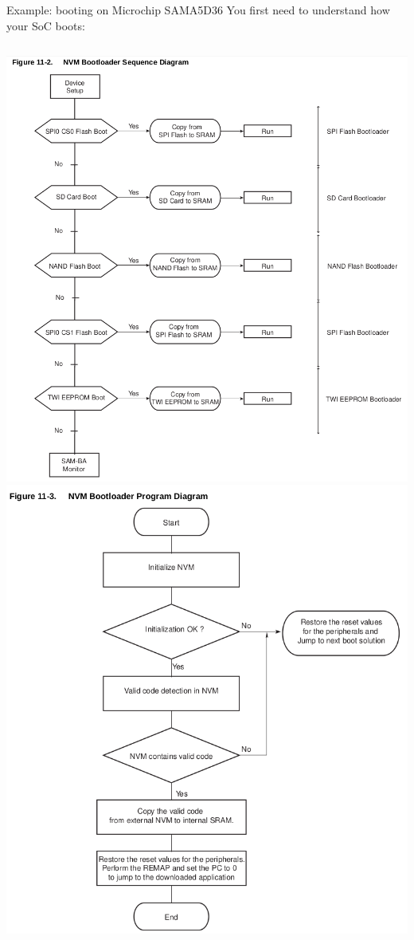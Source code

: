 \begin{frame}{Example: booting on Microchip SAMA5D36}
  \small You first need to understand how your SoC boots:
  \begin{columns}
    \includegraphics[height=0.7\textheight]{slides/boot-time-u-boot-falcon-mode/sama5d36-boot-diagram.png}
    \includegraphics[height=0.7\textheight]{slides/boot-time-u-boot-falcon-mode/sama5d36-nvm-bootloader-program.png}

\end{columns}
\end{frame}
